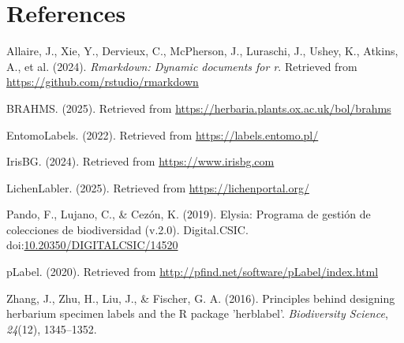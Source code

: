 \documentclass[10pt,a4paper,onecolumn]{article}
\newlength{\cslhangindent}
\newenvironment{CSLReferences}[2] %
 {\begin{list}{}{%
  \setlength{\itemindent}{0pt}
  \setlength{\leftmargin}{0pt}
  \setlength{\parsep}{0pt}
  \ifodd #1
   \setlength{\leftmargin}{\cslhangindent}
   \setlength{\itemindent}{-1\cslhangindent}
  \fi
  \setlength{\itemsep}{#2\baselineskip}}}
 {\end{list}}
\begin{document}
\section*{References}\label{references}

\label{refs}
\begin{CSLReferences}{1}{0}
Allaire, J., Xie, Y., Dervieux, C., McPherson, J., Luraschi, J., Ushey,
K., Atkins, A., et al. (2024). \emph{Rmarkdown: Dynamic documents for
r}. Retrieved from \url{https://github.com/rstudio/rmarkdown}

BRAHMS. (2025). Retrieved from
\url{https://herbaria.plants.ox.ac.uk/bol/brahms}

EntomoLabels. (2022). Retrieved from \url{https://labels.entomo.pl/}

IrisBG. (2024). Retrieved from \url{https://www.irisbg.com}

LichenLabler. (2025). Retrieved from \url{https://lichenportal.org/}

Pando, F., Lujano, C., \& Cezón, K. (2019). Elysia: Programa de gestión
de colecciones de biodiversidad (v.2.0). Digital.CSIC.
doi:\href{https://doi.org/10.20350/DIGITALCSIC/14520}{10.20350/DIGITALCSIC/14520}

pLabel. (2020). Retrieved from
\url{http://pfind.net/software/pLabel/index.html}

Zhang, J., Zhu, H., Liu, J., \& Fischer, G. A. (2016). Principles behind
designing herbarium specimen labels and the {R} package 'herblabel'.
\emph{Biodiversity Science}, \emph{24}(12), 1345--1352.

\end{CSLReferences}
\end{document}
